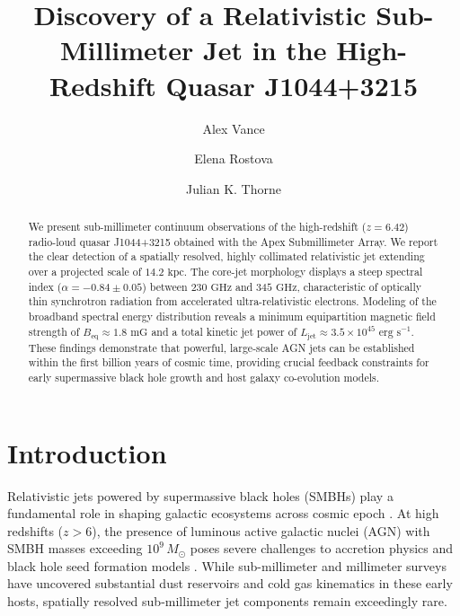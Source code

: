 \documentclass[twocolumn]{aastex631}
\begin{document}
\title{Discovery of a Relativistic Sub-Millimeter Jet in the High-Redshift Quasar J1044+3215}


\author[0000-0002-8192-3041]{Alex Vance}

\author[0000-0001-5542-9908]{Elena Rostova}

\author{Julian K. Thorne}

\begin{abstract}
We present sub-millimeter continuum observations of the high-redshift ($z = 6.42$) radio-loud quasar J1044+3215 obtained with the Apex Submillimeter Array. We report the clear detection of a spatially resolved, highly collimated relativistic jet extending over a projected scale of $14.2 \text{ kpc}$. The core-jet morphology displays a steep spectral index ($\alpha = -0.84 \pm 0.05$) between $230\text{ GHz}$ and $345\text{ GHz}$, characteristic of optically thin synchrotron radiation from accelerated ultra-relativistic electrons. Modeling of the broadband spectral energy distribution reveals a minimum equipartition magnetic field strength of $B_{\mathrm{eq}} \approx 1.8\text{ mG}$ and a total kinetic jet power of $L_{\mathrm{jet}} \approx 3.5 \times 10^{45}\text{ erg s}^{-1}$. These findings demonstrate that powerful, large-scale AGN jets can be established within the first billion years of cosmic time, providing crucial feedback constraints for early supermassive black hole growth and host galaxy co-evolution models.
\end{abstract}


\section{Introduction} \label{sec:intro}

Relativistic jets powered by supermassive black holes (SMBHs) play a fundamental role in shaping galactic ecosystems across cosmic epoch \citep{Vance2023}. At high redshifts ($z > 6$), the presence of luminous active galactic nuclei (AGN) with SMBH masses exceeding $10^9\,M_\odot$ poses severe challenges to accretion physics and black hole seed formation models \citep{Rostova2024}. While sub-millimeter and millimeter surveys have uncovered substantial dust reservoirs and cold gas kinematics in these early hosts, spatially resolved sub-millimeter jet components remain exceedingly rare.
\end{document}
